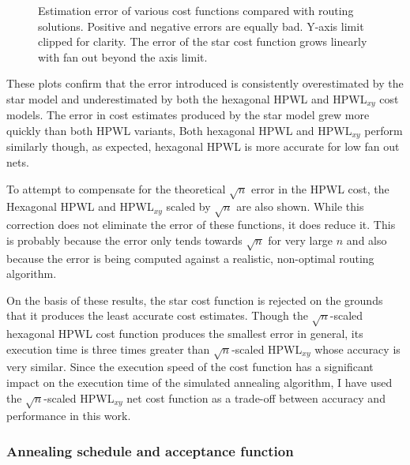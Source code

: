				\begin{figure}
					\center
					
					\caption[Estimation error of various cost functions.]%
					{Estimation error of various cost functions compared with
					routing solutions. Positive and negative errors are equally bad.
					Y-axis limit clipped for clarity. The error of the star cost function
					grows linearly with fan out beyond the axis limit.}
					\label{fig:cost-function-error}
				\end{figure}
				
				These plots confirm that the error introduced is consistently
				overestimated by the star model and underestimated by both the
				hexagonal HPWL and HPWL${_{xy}}$ cost models. The error in cost
				estimates produced by the star model grew more quickly than both HPWL
				variants, Both hexagonal HPWL and HPWL$_{xy}$ perform similarly though,
				as expected, hexagonal HPWL is more accurate for low fan out nets.
				
				To attempt to compensate for the theoretical $\sqrt{n}$ error in the
				HPWL cost, the Hexagonal HPWL and HPWL$_{xy}$ scaled by $\sqrt{n}$ are
				also shown. While this correction does not eliminate the error of these
				functions, it does reduce it. This is probably because the error only
				tends towards $\sqrt{n}$ for very large $n$ \cite{chung79} and also
				because the error is being computed against a realistic, non-optimal
				routing algorithm.
				
				On the basis of these results, the star cost function is rejected on
				the grounds that it produces the least accurate cost estimates. Though
				the $\sqrt{n}$-scaled hexagonal HPWL cost function produces the
				smallest error in general, its execution time is three times greater
				than $\sqrt{n}$-scaled HPWL$_{xy}$ whose accuracy is very similar.
				Since the execution speed of the cost function has a significant impact
				on the execution time of the simulated annealing algorithm, I have used
				the $\sqrt{n}$-scaled HPWL$_{xy}$ net cost function as a trade-off
				between accuracy and performance in this work.
				
			\subsubsection{Annealing schedule and acceptance function}
				
				\label{sec:placement-schedule-acceptance}
				
